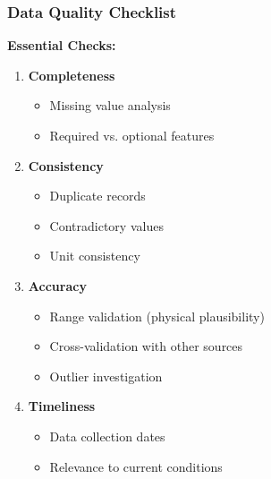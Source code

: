 \documentclass[aspectratio=169]{beamer}
\begin{document}
\begin{frame}
\frametitle{Data Quality Checklist}

\textbf{Essential Checks:}

\begin{enumerate}
    \item \textbf{Completeness}
    \begin{itemize}
        \item Missing value analysis
        \item Required vs. optional features
    \end{itemize}

    \item \textbf{Consistency}
    \begin{itemize}
        \item Duplicate records
        \item Contradictory values
        \item Unit consistency
    \end{itemize}

    \item \textbf{Accuracy}
    \begin{itemize}
        \item Range validation (physical plausibility)
        \item Cross-validation with other sources
        \item Outlier investigation
    \end{itemize}

    \item \textbf{Timeliness}
    \begin{itemize}
        \item Data collection dates
        \item Relevance to current conditions
    \end{itemize}
\end{enumerate}

\end{frame}
\end{document}
